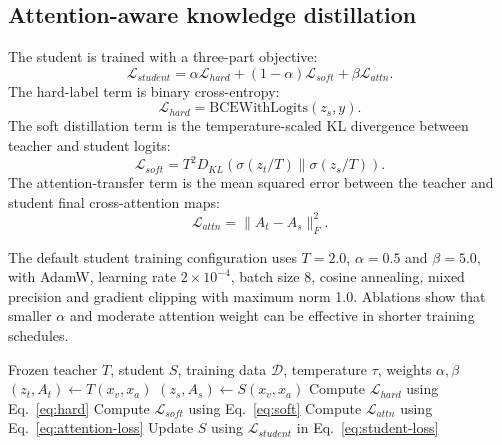 \documentclass[pdflatex,sn-basic,Numbered]{sn-jnl}
\begin{document}
\subsection{Attention-aware knowledge distillation}\label{subsec:distillation}

The student is trained with a three-part objective:
\begin{equation}
\mathcal{L}_{student} =
\alpha \mathcal{L}_{hard} + (1-\alpha)\mathcal{L}_{soft} + \beta \mathcal{L}_{attn}.
\label{eq:student-loss}
\end{equation}
The hard-label term is binary cross-entropy:
\begin{equation}
\mathcal{L}_{hard} = \mathrm{BCEWithLogits}(z_s, y).
\label{eq:hard}
\end{equation}
The soft distillation term is the temperature-scaled KL divergence between teacher and student logits:
\begin{equation}
\mathcal{L}_{soft} = T^2 D_{KL}\left(\sigma(z_t/T) \parallel \sigma(z_s/T)\right).
\label{eq:soft}
\end{equation}
The attention-transfer term is the mean squared error between the teacher and student final cross-attention maps:
\begin{equation}
\mathcal{L}_{attn} = \|A_t - A_s\|_F^2 .
\label{eq:attention-loss}
\end{equation}

The default student training configuration uses $T=2.0$, $\alpha=0.5$ and $\beta=5.0$, with AdamW, learning rate $2 \times 10^{-4}$, batch size 8, cosine annealing, mixed precision and gradient clipping with maximum norm 1.0. Ablations show that smaller $\alpha$ and moderate attention weight can be effective in shorter training schedules.

\begin{algorithm}[t]
\caption{Attention-aware PIN-Lite distillation}\label{alg:distillation}
\begin{algorithmic}[1]
\Require Frozen teacher $T$, student $S$, training data $\mathcal{D}$, temperature $\tau$, weights $\alpha,\beta$
    \State $(z_t,A_t) \gets T(x_v,x_a)$ 
    \State $(z_s,A_s) \gets S(x_v,x_a)$
    \State Compute $\mathcal{L}_{hard}$ using Eq.~\eqref{eq:hard}
    \State Compute $\mathcal{L}_{soft}$ using Eq.~\eqref{eq:soft}
    \State Compute $\mathcal{L}_{attn}$ using Eq.~\eqref{eq:attention-loss}
    \State Update $S$ using $\mathcal{L}_{student}$ in Eq.~\eqref{eq:student-loss}
\EndFor
\end{algorithmic}
\end{algorithm}
\end{document}
